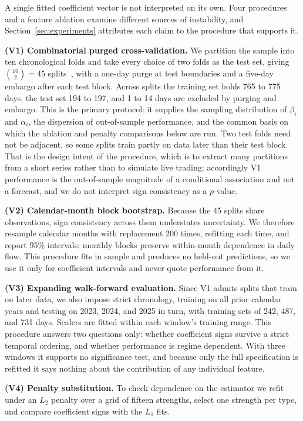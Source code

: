 \documentclass[sigconf,anonymous,review]{acmart}
\begin{document}
A single fitted coefficient vector is not interpreted on its own. Four
procedures and a feature ablation examine different sources of
instability, and Section~\ref{sec:experiments} attributes each claim to
the procedure that supports it.

\textbf{(V1) Combinatorial purged cross-validation.} We partition the
sample into ten chronological folds and take every choice of two folds as
the test set, giving $\binom{10}{2} = 45$ splits~\cite{lopezdeprado2018},
with a one-day purge at test boundaries and a five-day embargo after each
test block. Across splits the training set holds 765 to 775 days, the test
set 194 to 197, and 1 to 14 days are excluded by purging and embargo.
This is the primary protocol: it supplies the sampling distribution of
$\beta_i$ and $\alpha_i$, the dispersion of out-of-sample performance,
and the common basis on which the ablation and penalty comparisons below
are run. Two test folds need not be adjacent, so some splits train partly
on data later than their test block. That is the design intent of the
procedure, which is to extract many partitions from a short series rather
than to simulate live trading; accordingly V1 performance is the
out-of-sample magnitude of a conditional association and not a forecast,
and we do not interpret sign consistency as a $p$-value.

\textbf{(V2) Calendar-month block bootstrap.} Because the 45 splits share
observations, sign consistency across them understates uncertainty. We
therefore resample calendar months with replacement 200 times, refitting
each time, and report 95\% intervals; monthly blocks preserve
within-month dependence in daily flow. This procedure fits in sample and
produces no held-out predictions, so we use it only for coefficient
intervals and never quote performance from it.

\textbf{(V3) Expanding walk-forward evaluation.} Since V1 admits splits
that train on later data, we also impose strict chronology, training on
all prior calendar years and testing on 2023, 2024, and 2025 in turn,
with training sets of 242, 487, and 731 days. Scalers are fitted within
each window's training range. This procedure answers two questions only:
whether coefficient signs survive a strict temporal ordering, and whether
performance is regime dependent. With three windows it supports no
significance test, and because only the full specification is refitted it
says nothing about the contribution of any individual feature.

\textbf{(V4) Penalty substitution.} To check dependence on the estimator
we refit under an $L_2$ penalty over a grid of fifteen strengths, select
one strength per type, and compare coefficient signs with the $L_1$
fits.
\end{document}
